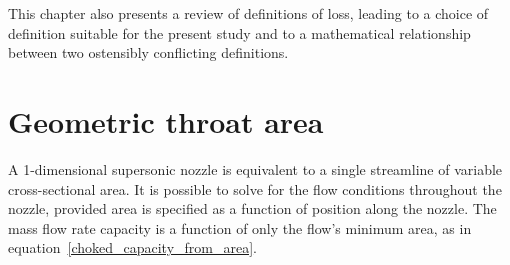 \documentclass[a4paper, 11pt, oneside]{report}
\begin{document}
This chapter also presents a review of definitions of loss, leading to a choice of definition suitable for the present study and to a mathematical relationship between two ostensibly conflicting definitions.


\chapter{Geometric throat area}
\label{chapter_geometric_throat_area}





A 1-dimensional supersonic nozzle is equivalent to a single streamline of variable cross-sectional area. It is possible to solve for the flow conditions throughout the nozzle, provided area is specified as a function of position along the nozzle. The mass flow rate capacity is a function of only the flow's minimum area, as in equation~\ref{choked_capacity_from_area}.
\end{document}
